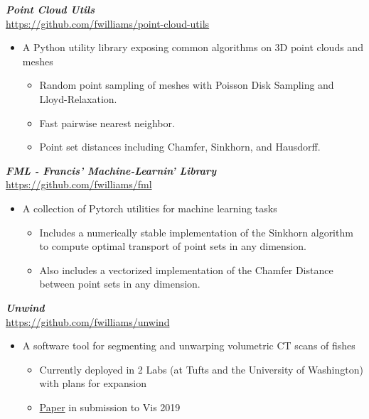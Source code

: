 \documentclass[line,10pt]{res}
\newcommand{\resumetitlemar}{0.5em}
\begin{document}
\begin{resume}
{\sl \textbf{Point Cloud Utils}}\\
\url{https://github.com/fwilliams/point-cloud-utils}
\vspace{\resumetitlemar}
\begin{itemize} \itemsep -2pt
\item A Python utility library exposing common algorithms on 3D point clouds and meshes
\vspace{-0.4em}
\begin{itemize} \itemsep -2pt
\item Random point sampling of meshes with Poisson Disk Sampling and Lloyd-Relaxation.
\item Fast pairwise nearest neighbor.
\item Point set distances including Chamfer, Sinkhorn, and Hausdorff.
\end{itemize}
\end{itemize}

{\sl \textbf{FML - Francis' Machine-Learnin' Library}}\\
\url{https://github.com/fwilliams/fml}
\vspace{\resumetitlemar}
\begin{itemize} \itemsep -2pt
\item A collection of Pytorch utilities for machine learning tasks
\vspace{-0.4em}
\begin{itemize} \itemsep -2pt
\item Includes a numerically stable implementation of the Sinkhorn algorithm to compute optimal transport of point sets in any dimension.
\item Also includes a vectorized implementation of the Chamfer Distance between point sets in any dimension.
\end{itemize}
\end{itemize}

{\sl \textbf{Unwind}}\\
\url{https://github.com/fwilliams/unwind}
\vspace{\resumetitlemar}
\begin{itemize} \itemsep -2pt
\item A software tool for segmenting and unwarping volumetric CT scans of fishes
\vspace{-0.4em}
\begin{itemize} \itemsep -2pt
\item Currently deployed in 2 Labs (at Tufts and the University of Washington) with plans for expansion
\item \href{https://arxiv.org/abs/1904.04890}{Paper} in submission to Vis 2019
\end{itemize}
\end{itemize}


\end{resume}
\end{document}
